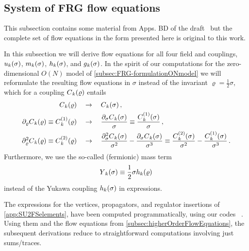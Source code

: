 \subsection{System of FRG flow equations}\label{subsec:0dSU2flowEqs}
\begin{disclaimer}
	This subsection contains some material from Apps. B\dash{}D of the draft~\cite{Steil:partIV} but the complete set of flow equations in the form presented here is original to this work.
\end{disclaimer}
In this subsection we will derive flow equations for all four field and \rgscaledependent{} couplings, $\FScoupling{u}{0}{\sigma}$, $\FScoupling{m}{0}{\sigma}$, $\FScoupling{h}{0}{\sigma}$, and $\FScoupling{g}{0}{\sigma}$.
In the spirit of our computations for the zero-dimensional $O(N)$ model of \cref{subsec:FRG-formulationONmodel} we will reformulate the resulting flow equations in $\sigma$ instead of the invariant $\varrho=\tfrac{1}{2}\sigma$, which for a coupling $\FScoupling{C}{0}{\varrho}$ entails
\begin{subequations}\label{eq:eq:SU2model0sigmaRho}
\begin{align}
\FScoupling{C}{0}{\varrho}&\quad\rightarrow\quad \FScoupling{C}{0}{\sigma}\,,\\
\partial_\varrho\FScoupling{C}{0}{\varrho}\equiv \FScoupling{C}{1}{\varrho} &\quad\rightarrow\quad \frac{\partial_\sigma \FScoupling{C}{0}{\sigma}}{\sigma} \equiv \frac{ \FScoupling{C}{1}{\sigma}}{\sigma}\,,\\
\partial_\varrho^2\FScoupling{C}{0}{\varrho}\equiv \FScoupling{C}{2}{\varrho} &\quad\rightarrow\quad \frac{\partial_\sigma^2 \FScoupling{C}{0}{\sigma}}{\sigma^2}  - \frac{ \partial_\sigma\FScoupling{C}{0}{\sigma}}{\sigma^3} \equiv \frac{ \FScoupling{C}{2}{\sigma}}{\sigma^2} - \frac{ \FScoupling{C}{1}{\sigma}}{\sigma^3}\,.
\end{align}
\end{subequations}
Furthermore, we use the so-called (fermionic) mass term
\begin{align}
\FScoupling{Y}{0}{\sigma}\equiv \frac{1}{2}\sigma\FScoupling{h}{0}{\varrho}
\label{eq:SU2model0Ydef}
\end{align}
instead of the Yukawa coupling $\FScoupling{h}{0}{\sigma}$ in expressions.

The expressions for the vertices, propagators, and regulator insertions of \cref{app:SU2FSelements}, have been computed programmatically, using our \WAM{} codes ~\cite{Steil:2023PhDFlowEquationsNB,Steil:2023zeroDSU2}.
Using them and the flow equations from \cref{subsec:higherOrderFlowEquations}, the subsequent derivations reduce to straightforward computations involving just sums/traces.

